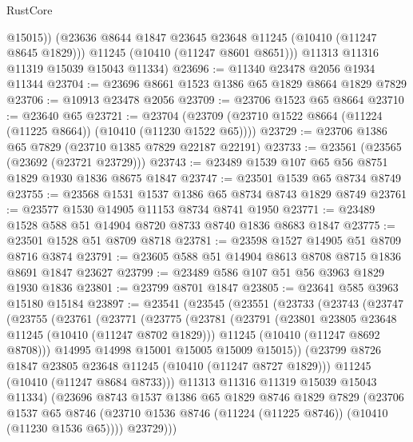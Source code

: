 \begin{lexlean}{RustCore}
\begin{coremodule}
            @15015))
        (@23636 @8644 @1847 @23645 @23648 @11245 (@10410 (@11247 @8645 @1829)))
        @11245
        (@10410 (@11247 @8601 @8651)))
      @11313
      @11316
      @11319
      @15039
      @15043
      @11334)
@23696 := @11340 @23478 @2056 @1934 @11344
@23704 := @23696 @8661 @1523 @1386 @65 @1829 @8664 @1829 @7829
@23706 := @10913 @23478 @2056
@23709 := @23706 @1523 @65 @8664
@23710 := @23640 @65
@23721 := @23704 (@23709 (@23710 @1522 @8664 (@11224 (@11225 @8664)) (@10410 (@11230 @1522 @65))))
@23729 := @23706 @1386 @65 @7829 (@23710 @1385 @7829 @22187 @22191)
@23733 := @23561 (@23565 (@23692 (@23721 @23729)))
@23743 := @23489 @1539 @107 @65 @56 @8751 @1829 @1930 @1836 @8675 @1847
@23747 := @23501 @1539 @65 @8734 @8749
@23755 := @23568 @1531 @1537 @1386 @65 @8734 @8743 @1829 @8749
@23761 := @23577 @1530 @14905 @11153 @8734 @8741 @1950
@23771 := @23489 @1528 @588 @51 @14904 @8720 @8733 @8740 @1836 @8683 @1847
@23775 := @23501 @1528 @51 @8709 @8718
@23781 := @23598 @1527 @14905 @51 @8709 @8716 @3874
@23791 := @23605 @588 @51 @14904 @8613 @8708 @8715 @1836 @8691 @1847 @23627
@23799 := @23489 @586 @107 @51 @56 @3963 @1829 @1930 @1836
@23801 := @23799 @8701 @1847
@23805 := @23641 @585 @3963 @15180 @15184
@23897 := @23541
    (@23545
      (@23551
        (@23733
          (@23743
            (@23747
              (@23755
                (@23761
                  (@23771
                    (@23775
                      (@23781
                        (@23791
                          (@23801 @23805 @23648 @11245 (@10410 (@11247 @8702 @1829)))
                          @11245
                          (@10410 (@11247 @8692 @8708)))
                        @14995
                        @14998
                        @15001
                        @15005
                        @15009
                        @15015))
                    (@23799 @8726 @1847 @23805 @23648 @11245 (@10410 (@11247 @8727 @1829)))
                    @11245
                    (@10410 (@11247 @8684 @8733)))
                  @11313
                  @11316
                  @11319
                  @15039
                  @15043
                  @11334)
                (@23696
                  @8743
                  @1537
                  @1386
                  @65
                  @1829
                  @8746
                  @1829
                  @7829
                  (@23706
                    @1537
                    @65
                    @8746
                    (@23710 @1536 @8746 (@11224 (@11225 @8746)) (@10410 (@11230 @1536 @65))))
                  @23729)))

\end{coremodule}
\end{lexlean}
